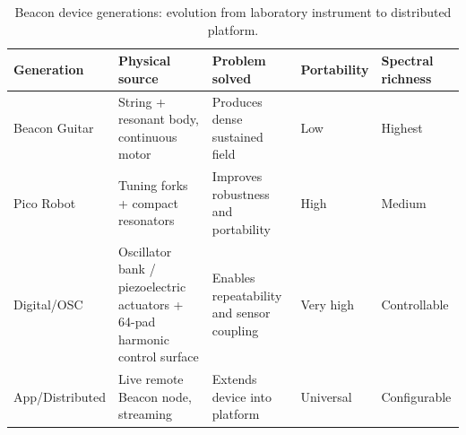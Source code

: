 \begin{table}[ht]
\centering
\caption{Beacon device generations: evolution from laboratory instrument to distributed platform.}
\label{tab:beacon_generations}
\footnotesize
\renewcommand{\arraystretch}{1.08}
\begin{tabularx}{\textwidth}{@{}P{0.14\textwidth}Y Y P{0.10\textwidth}P{0.13\textwidth}@{}}
\toprule
Generation & Physical source & Problem solved & Porta\-bility & Spectral richness \\
\midrule
Beacon Guitar & String + resonant body, continuous motor & Produces dense sustained field & Low & Highest \\
Pico Robot & Tuning forks + compact resonators & Improves robustness and portability & High & Medium \\
Digital/OSC & Oscillator bank / piezoelectric actuators + 64-pad harmonic control surface & Enables repeatability and sensor coupling & Very high & Controllable \\
App/\newline Distributed & Live remote Beacon node, streaming & Extends device into platform & Universal & Configur\-able \\
\bottomrule
\end{tabularx}
\renewcommand{\arraystretch}{1}
\end{table}

